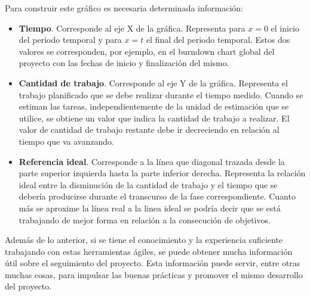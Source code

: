Para construir este gráfico es necesaria determinada información:
\begin{itemize}
    \item \textbf{Tiempo}. Corresponde al eje X de la gráfica. Representa para $x=0$ el inicio del periodo temporal y para $x=t$ el final del periodo temporal. Estos dos valores se corresponden, por ejemplo, en el burndown chart global del proyecto con las fechas de inicio y finalización del mismo.
    \item \textbf{Cantidad de trabajo}. Corresponde al eje Y de la gráfica. Representa el trabajo planificado que se debe realizar durante el tiempo medido. Cuando se estiman las tareas, independientemente de la unidad de estimación que se utilice, se obtiene un valor que indica la cantidad de trabajo a realizar. El valor de cantidad de trabajo restante debe ir decreciendo en relación al tiempo que va avanzando.
    \item \textbf{Referencia ideal}. Corresponde a la línea que diagonal trazada desde la parte superior izquierda hasta la parte inferior derecha. Representa la relación ideal entre la disminución de la cantidad de trabajo y el tiempo que se debería producirse durante el transcurso de la fase correspondiente. Cuanto más se aproxime la línea real a la linea ideal se podría decir que se está trabajando de mejor forma en relación a la consecución de objetivos.
\end{itemize}

Además de lo anterior, si se tiene el conocimiento y la experiencia suficiente trabajando con estas herramientas ágiles, se puede obtener mucha información útil sobre el seguimiento del proyecto. Esta información puede servir, entre otras muchas cosas, para impulsar las buenas prácticas y promover el mismo desarrollo del proyecto. 

